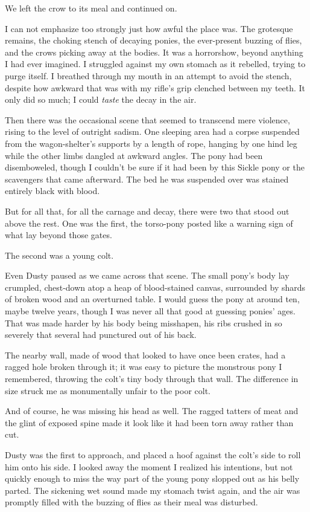 We left the crow to its meal and continued on.

I can not emphasize too strongly just how awful the place was. The grotesque remains, the choking stench of decaying ponies, the ever-present buzzing of flies, and the crows picking away at the bodies. It was a horrorshow, beyond anything I had ever imagined. I struggled against my own stomach as it rebelled, trying to purge itself. I breathed through my mouth in an attempt to avoid the stench, despite how awkward that was with my rifle’s grip clenched between my teeth. It only did so much; I could \textit{taste} the decay in the air.

Then there was the occasional scene that seemed to transcend mere violence, rising to the level of outright sadism. One sleeping area had a corpse suspended from the wagon-shelter’s supports by a length of rope, hanging by one hind leg while the other limbs dangled at awkward angles. The pony had been disemboweled, though I couldn’t be sure if it had been by this Sickle pony or the scavengers that came afterward. The bed he was suspended over was stained entirely black with blood.

But for all that, for all the carnage and decay, there were two that stood out above the rest. One was the first, the torso-pony posted like a warning sign of what lay beyond those gates.

The second was a young colt.

Even Dusty paused as we came across that scene. The small pony’s body lay crumpled, chest-down atop a heap of blood-stained canvas, surrounded by shards of broken wood and an overturned table. I would guess the pony at around ten, maybe twelve years, though I was never all that good at guessing ponies’ ages. That was made harder by his body being misshapen, his ribs crushed in so severely that several had punctured out of his back.

The nearby wall, made of wood that looked to have once been crates, had a ragged hole broken through it; it was easy to picture the monstrous pony I remembered, throwing the colt’s tiny body through that wall. The difference in size struck me as monumentally unfair to the poor colt.

And of course, he was missing his head as well. The ragged tatters of meat and the glint of exposed spine made it look like it had been torn away rather than cut.

Dusty was the first to approach, and placed a hoof against the colt’s side to roll him onto his side. I looked away the moment I realized his intentions, but not quickly enough to miss the way part of the young pony slopped out as his belly parted. The sickening wet sound made my stomach twist again, and the air was promptly filled with the buzzing of flies as their meal was disturbed.

